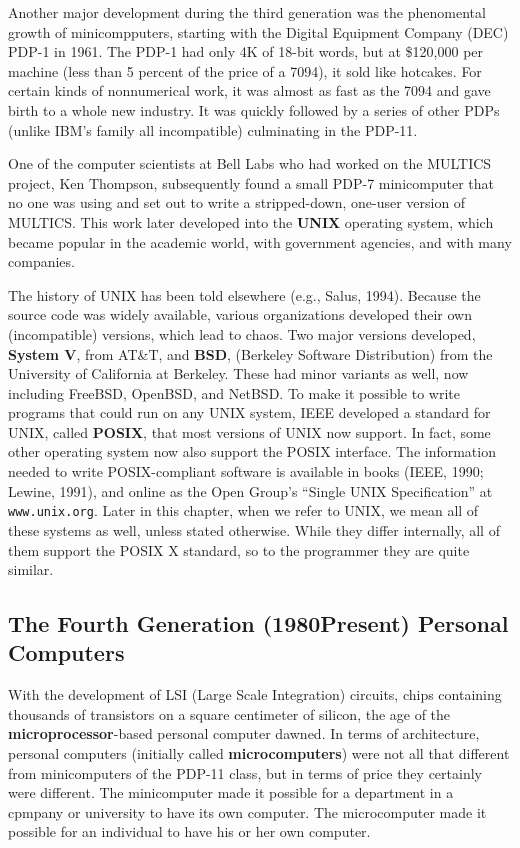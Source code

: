 \documentclass{book}
\newcommand {\kw}  [1] {\textbf{#1}}
\newcommand {\www} [1] {\texttt{#1}}
\begin{document}
Another major development during the third generation was the phenomental growth of minicompputers, 
starting with the Digital Equipment Company (DEC) PDP-1 in 1961.
The PDP-1 had only 4K of 18-bit words, but at \$120,000 per machine (less than 5 percent of the price of a 7094), it sold like hotcakes.
For certain kinds of nonnumerical work, it was almost as fast as the 7094 and gave birth to a whole new industry.
It was quickly followed by a series of other PDPs (unlike IBM's family all incompatible) culminating in the PDP-11.

One of the computer scientists at Bell Labs who had worked on the MULTICS project, Ken Thompson, 
subsequently found a small PDP-7 minicomputer that no one was using and set out to write a stripped-down, one-user version of MULTICS.
This work later developed into the \kw{UNIX} operating system, which became popular in the academic world, 
with government agencies, and with many companies.

The history of UNIX has been told elsewhere (e.g., Salus, 1994).
Because the source code was widely available, various organizations developed their own (incompatible) versions, which lead to chaos.
Two major versions developed, \kw{System V}, from AT\&T, and \kw{BSD}, (Berkeley Software Distribution) from the University of California at Berkeley.
These had minor variants as well, now including FreeBSD, OpenBSD, and NetBSD.
To make it possible to write programs that could run on any UNIX system, IEEE developed a standard for UNIX, called \kw{POSIX},
that most versions of UNIX now support.
In fact, some other operating system now also support the POSIX interface.
The information needed to write POSIX-compliant software is available in books (IEEE, 1990; Lewine, 1991),
and online as the Open Group's ``Single UNIX Specification'' at \www{www.unix.org}.
Later in this chapter, when we refer to UNIX, we mean all of these systems as well, unless stated otherwise.
While they differ internally, all of them support the POSIX X standard, so to the programmer they are quite similar.

\subsection{The Fourth Generation (1980Present) Personal Computers}
With the development of LSI (Large Scale Integration) circuits, chips containing thousands of transistors on a square centimeter of silicon,
the age of the \kw{microprocessor}-based personal computer dawned.
In terms of architecture, personal computers (initially called \kw{microcomputers}) were not all that different from minicomputers of the PDP-11 class, 
but in terms of price they certainly were different.
The minicomputer made it possible for a department in a cpmpany or university to have its own computer.
The microcomputer made it possible for an individual to have his or her own computer.
\end{document}
